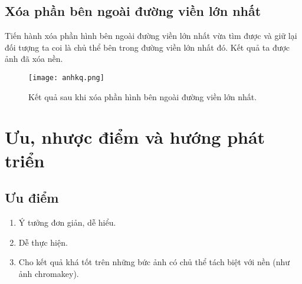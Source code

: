\documentclass[conference]{IEEEtran}
\begin{document}
\subsection{Xóa phần bên ngoài đường viền lớn nhất}
Tiến hành xóa phần hình bên ngoài đường viền lớn nhất vừa tìm được và giữ lại đối tượng ta coi là chủ thể bên trong đường viền lớn nhất đó. Kết quả ta được ảnh đã xóa nền.
\begin{figure}[!htb]
\centerline{\texttt{[image: anhkq.png]}}
\caption{Kết quả sau khi xóa phần hình bên ngoài đường viền lớn nhất.}
\label{fig}
\end{figure}
 \FloatBarrier
 \section{Ưu, nhược điểm và hướng phát triển}
 \subsection{Ưu điểm}
 \begin{enumerate}
     \item Ý tưởng đơn giản, dễ hiểu.
     \item Dễ thực hiện.
     \item Cho kết quả khá tốt trên những bức ảnh có chủ thể tách biệt với nền (như ảnh chromakey).
 \end{enumerate}
\end{document}
